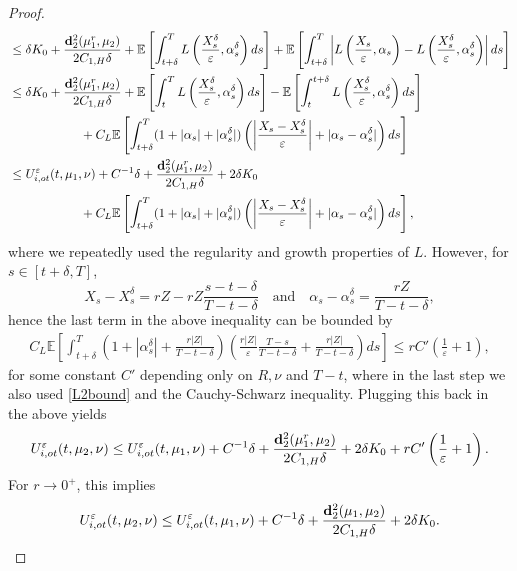 \documentclass[reqno,11pt]{amsart}
\numberwithin{equation}{section}
\newcommand{\e}{\varepsilon}
\begin{document}
\begin{proof}
\begin{align*}
        &\le \delta K_0 +\frac{{\bf d}_2^2(\mu_1^r,\mu_2)}{2 C_{1,H} \delta}+ \mathbb{E}\left[ \int_{t+\delta}^T L\left(\frac{X_s^\delta}{\e},\alpha_s^\delta\right)ds \right] +\mathbb{E}\left[\int_{t+\delta}^T\left|L\left(\frac{X_s}{\e},\alpha_s\right)-L\left(\frac{X_s^\delta}{\e},\alpha_s^\delta\right)\right|  ds\right]\\
        &\le \delta K_0 +\frac{{\bf d}_2^2(\mu_1^r,\mu_2)}{2 C_{1,H} \delta}+\mathbb{E}\left[ \int_{t}^T L\left(\frac{X_s^\delta}{\e},\alpha_s^\delta\right)ds \right] -\mathbb{E}\left[ \int^{t+\delta}_t L\left(\frac{X_s^\delta}{\e},\alpha_s^\delta\right)ds \right]\\
        &\hspace{2cm} +C_L\mathbb{E}\left[\int_{t+\delta}^T(1+|\alpha_s|+|\alpha_s^\delta|)\left( \left|\frac{X_s-X_s^\delta}{\e}\right|+|\alpha_s-\alpha_s^\delta|   \right)ds\right]\\
        &\le U_{i,ot}^\e(t,\mu_1,\nu)+C^{-1}\delta +\frac{{\bf d}_2^2(\mu_1^r,\mu_2)}{2 C_{1,H} \delta}+2\delta K_0\\
         &\hspace{2cm}+C_L\mathbb{E}\left[\int_{t+\delta}^T(1+|\alpha_s|+|\alpha_s^\delta|)\left( \left|\frac{X_s-X_s^\delta}{\e}\right|+|\alpha_s-\alpha_s^\delta|   \right)ds\right],
        \end{align*}
        where we repeatedly used the regularity and growth properties of $L.$ However, for $s\in [t+\delta,T]$,
        $$X_s-X_s^\delta=rZ-rZ\frac{s-t-\delta}{T-t-\delta}\quad\text{and}\quad\alpha_s-\alpha_s^\delta=\frac{rZ}{T-t-\delta},$$
        hence the last term in the above inequality can be bounded by
        \begin{align*}
            C_L\mathbb{E}\left[\int_{t+\delta}^T\left(1+|\alpha_s^\delta|+\frac{r|Z|}{T-t-\delta}\right)\left(\frac{r|Z|}{\e}\frac{T-s}{T-t-\delta}+\frac{r|Z|}{T-t-\delta}  \right)ds\right]\le rC'\left(\frac{1}{\e}+1\right),
        \end{align*}
        for some constant $C'$ depending only on $R,\nu$ and $T-t$, where in the last step we also used \eqref{L2bound} and the Cauchy-Schwarz inequality. Plugging this back in the above yields
        $$U^\e_{i,ot}(t,\mu_2,\nu)\le U_{i,ot}^\e(t,\mu_1,\nu)+C^{-1}\delta +\frac{{\bf d}_2^2(\mu_1^{r},\mu_2)}{2 C_{1,H} \delta}+2\delta K_0+rC'\left(\frac{1}{\e}+1\right).$$
        For $r\to 0^+$, this implies
        $$U^\e_{i,ot}(t,\mu_2,\nu)\le U_{i,ot}^\e(t,\mu_1,\nu)+C^{-1}\delta +\frac{{\bf d}_2^2(\mu_1,\mu_2)}{2 C_{1,H} \delta}+2\delta K_0.$$

\end{proof}
\end{document}
